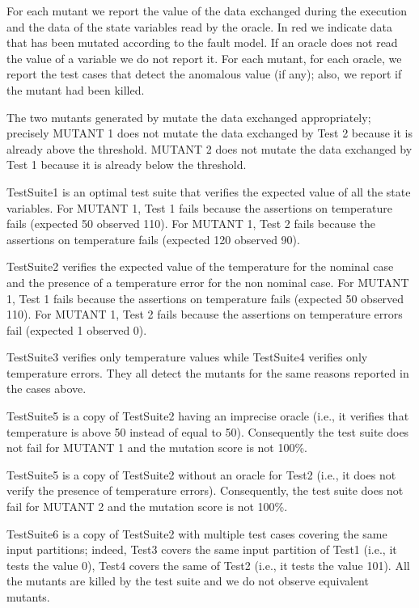 For each mutant we report the value of the data exchanged during the execution and the data of the state variables read by the oracle. In red we indicate data that has been mutated according to the fault model. 
If an oracle does not read the value of a variable we do not report it.
For each mutant, for each oracle, we report the test cases that detect the anomalous value (if any); also, we report if the mutant had been killed.

The two mutants generated by \APPR mutate the data exchanged appropriately; precisely MUTANT 1 does not mutate the data exchanged by Test 2 because it is already above the threshold. MUTANT 2 does not mutate the data exchanged by Test 1 because it is already below the threshold.

TestSuite1 is an optimal test suite that verifies the expected value of all the state variables. For MUTANT 1, Test 1 fails because the assertions on temperature fails (expected 50 observed 110).
For MUTANT 1, Test 2 fails because the assertions on temperature fails (expected 120 observed 90).

TestSuite2 verifies the expected value of the temperature for the nominal case and the presence of a temperature error for the non nominal case. For MUTANT 1, Test 1 fails because the assertions on temperature fails (expected 50 observed 110).
For MUTANT 1, Test 2 fails because the assertions on temperature errors fail (expected 1 observed 0).

TestSuite3 verifies only temperature values while TestSuite4 verifies only temperature errors. They all detect the mutants for the same reasons reported in the cases above.

TestSuite5 is a copy of TestSuite2 having an imprecise oracle (i.e., it verifies that temperature is above 50 instead of equal to 50). Consequently the test suite does not fail for MUTANT 1 and the mutation score is not 100\%.

TestSuite5 is a copy of TestSuite2 without an oracle for Test2 (i.e., it does not verify the presence of temperature errors). Consequently, the test suite does not fail for MUTANT 2 and the mutation score is not 100\%.

TestSuite6 is a copy of TestSuite2 with multiple test cases covering the same input partitions; indeed, Test3 covers the same input partition of Test1 (i.e., it tests the value 0), Test4 covers the same of Test2 (i.e., it tests the value 101). All the mutants are killed by the test suite and we do not observe equivalent mutants.

